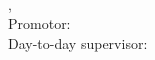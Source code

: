 \begin{titlepage}
	\thesisDate \\

\end{titlepage}


\hfill
\vfill
{
	\small
	\textbf{\thesisName} \\
	\textit{\thesisTitle} \\
	\thesisSubject, \thesisDate \\
	Promotor: \thesisFirstSupervisor \\
	Day-to-day supervisor: \thesisSecondSupervisor \\[1.5em]
	\textbf{\thesisUniversity} \\
	\textit{\thesisUniversityGroup} \\
	\thesisUniversityDepartment \\
	\thesisUniversityStreetAddress \\
	\thesisUniversityPostalCode\, \thesisUniversityCity
}
